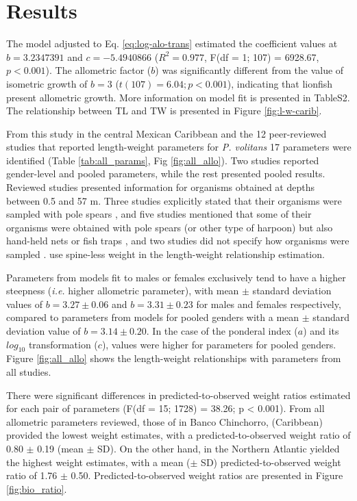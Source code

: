 \documentclass[fleqn,10pt,lineno]{wlpeerj} %
\begin{document}
\section*{Results}

The model adjusted to Eq. \ref{eq:log-alo-trans} estimated the
coefficient values at \(b = 3.2347391\) and \(c = -5.4940866\)
(\(R^2 = 0.977\), F(df = 1; 107) = 6928.67, \(p < 0.001\)). The
allometric factor (\(b\)) was significantly different from the value of
isometric growth of \(b = 3\) (\(t(107) = 6.04; p<0.001\)), indicating
that lionfish present allometric growth. More information on model fit
is presented in TableS2. The relationship between TL and TW is presented
in Figure \ref{fig:l-w-carib}.

From this study in the central Mexican Caribbean and the 12
peer-reviewed studies that reported length-weight parameters for
\emph{P. volitans} 17 parameters were identified (Table
\ref{tab:all_params}, Fig \ref{fig:all_allo}). Two studies
\citep{aguilarperera_2016,fogg_2013} reported gender-level and pooled
parameters, while the rest presented pooled results. Reviewed studies
presented information for organisms obtained at depths between 0.5 and
57 m. Three studies explicitly stated that their organisms were sampled
with pole spears
\citep{aguilarperera_2016,chin_2016,dahl_2014,sabidoitz_2016}, and five
studies mentioned that some of their organisms were obtained with pole
spears (or other type of harpoon) but also hand-held nets or fish traps
\citep{sandel_2015,barbour_2011,fogg_2013,edwards_2014,sabidoitza_2016,sabidoitz_2016,toledohernndez_2014},
and two studies did not specify how organisms were sampled
\citep{deleon_2013,darling_2011}. \citet{fogg_2013} use spine-less
weight in the length-weight relationship estimation.

Parameters from models fit to males or females exclusively tend to have
a higher steepness (\emph{i.e.} higher allometric parameter), with mean
\(\pm\) standard deviation values of \(b = 3.27 \pm 0.06\) and
\(b = 3.31 \pm 0.23\) for males and females respectively, compared to
parameters from models for pooled genders with a mean \(\pm\) standard
deviation value of \(b = 3.14 \pm 0.20\). In the case of the ponderal
index (\(a\)) and its \(log_{10}\) transformation (\(c\)), values were
higher for parameters for pooled genders. Figure \ref{fig:all_allo}
shows the length-weight relationships with parameters from all studies.

There were significant differences in predicted-to-observed weight
ratios estimated for each pair of parameters (F(df = 15; 1728) = 38.26;
p \textless{} 0.001). From all allometric parameters reviewed, those of
\citet{sabidoitz_2016} in Banco Chinchorro, (Caribbean) provided the
lowest weight estimates, with a predicted-to-observed weight ratio of
0.80 \(\pm\) 0.19 (mean \(\pm\) SD). On the other hand,
\citet{barbour_2011} in the Northern Atlantic yielded the highest weight
estimates, with a mean (\(\pm\) SD) predicted-to-observed weight ratio
of 1.76 \(\pm\) 0.50. Predicted-to-observed weight ratios are presented
in Figure \ref{fig:bio_ratio}.
\end{document}
